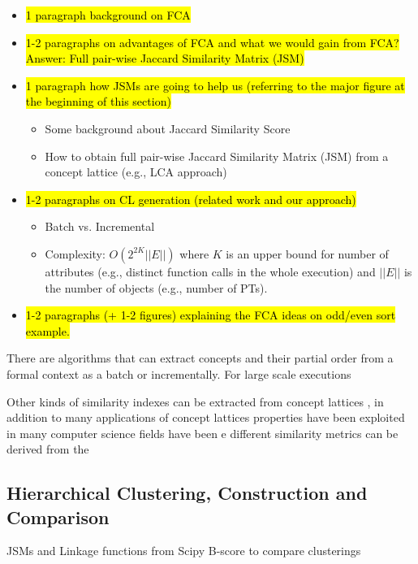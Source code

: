 \begin{itemize}
	\item \hl{1 paragraph background on FCA}
	\item \hl{1-2 paragraphs on advantages of FCA and what we would gain from FCA? Answer: Full pair-wise Jaccard Similarity Matrix (JSM)}
	\item \hl{1 paragraph how JSMs are going to help us (referring to the major figure at the beginning of this section)}
	\begin{itemize}
		\item Some background about Jaccard Similarity Score
		\item How to obtain full pair-wise Jaccard Similarity Matrix (JSM) from a concept lattice (e.g., LCA approach)
	\end{itemize}
	\item \hl{1-2 paragraphs on CL generation (related work and our approach)}
	\begin{itemize}
		\item Batch vs. Incremental \cite{clconst}
		\item Complexity: $O(2^{2K}||E||)$ where $K$ is an upper bound for number of attributes (e.g., distinct function calls in the whole execution) and $||E||$ is the number of objects (e.g., number of PTs).
	\end{itemize}
	\item \hl{1-2 paragraphs (+ 1-2 figures) explaining the FCA ideas on odd/even sort example.}
\end{itemize}


There are algorithms that can extract concepts and their partial order from a formal context as a batch or incrementally. For large scale executions 

Other kinds of similarity indexes can be extracted from concept lattices \cite{Alqadah2011}, in addition to many applications of concept lattices  properties have been exploited in many computer science fields have been e different similarity metrics can be derived from the

\subsection{Hierarchical Clustering, Construction and Comparison}
 \label{subsec:algo-bscore}
JSMs and Linkage functions from Scipy 
B-score to compare clusterings